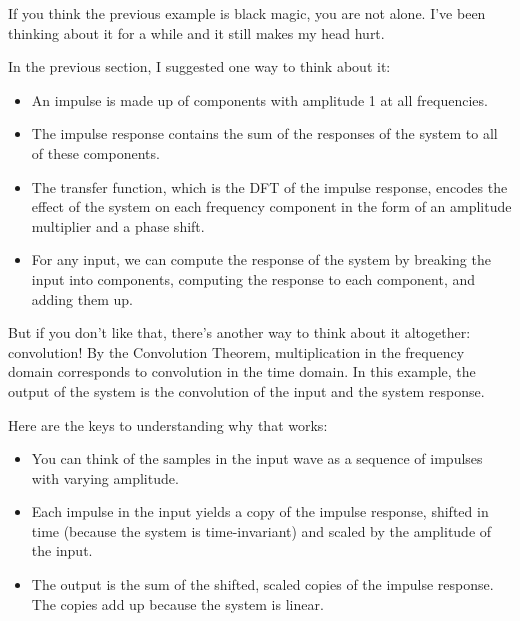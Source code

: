 If you think the previous example is black magic,
you are not alone.  I've been thinking about it for a while and it
still makes my head hurt.

In the previous section, I suggested one way to think about it:

\begin{itemize}
	
	\item An impulse is made up of components with amplitude 1 at all
	frequencies.
	
	\item The impulse response contains the sum of the responses of the
	system to all of these components.
	
	\item The transfer function, which is the DFT of the impulse response,
	encodes the effect of the system on each frequency component in the form
	of an amplitude multiplier and a phase shift.
	
	\item For any input, we can compute the response of the system
	by breaking the input into components, computing the response to
	each component, and adding them up.
	
\end{itemize}

But if you don't like that, there's another way to think about
it altogether: convolution!  By the Convolution Theorem, multiplication
in the frequency domain corresponds to convolution in the time
domain.  In this example, the output of the system is the convolution
of the input and the system response.

Here are the keys to understanding why that works:

\begin{itemize}
	
	\item You can think of the samples in the input wave as a sequence
	of impulses with varying amplitude.
	
	\item Each impulse in the input yields a copy of the impulse response,
	shifted in time (because the system is time-invariant) and scaled by
	the amplitude of the input.
	
	\item The output is the sum of the shifted, scaled copies of the
	impulse response.  The copies add up because the system is linear.
	
\end{itemize}


